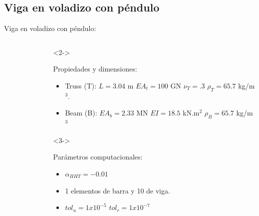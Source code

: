 \documentclass[
  aspectratio=169,
]{beamer}
\begin{document}
\begin{small}
\subsection[Viga en voladizo con péndulo]{Viga en voladizo con péndulo}
\begin{frame}[t]{Viga en voladizo con péndulo:}
	\begin{columns}[T,onlytextwidth]
		\begin{column}{.58\textwidth}
			\begin{minipage}{\textwidth}
				\begin{figure}[htbp]
					\centering
					\def\svgwidth{70mm}
					
				\end{figure}
			\end{minipage}  
		\end{column}
		\begin{column}{.4\textwidth}
			\begin{onlyenv}<2->
				\begin{minipage}{\textwidth}
					\vspace{-1cm}
					\begin{block}{Propiedades y dimensiones:}
						\begin{itemize}
							\item {\color{blue} Truss (T)}: $L= 3.04$ m $EA_t= 100$ GN $\nu_T=.3$ $\rho_T=65.7$ kg/m $^3$.
							\item {\color{red} Beam (B)}:  $EA_b= 2.33$ MN $EI= 18.5$ kN.m$^2$   $\rho_B=65.7$ kg/m$^3$
						\end{itemize}	 
					\end{block}
				\end{minipage}
			\end{onlyenv}
			\begin{onlyenv}<3->
				\begin{minipage}{\textwidth}
					\begin{block}{Parámetros computacionales:}
						\begin{itemize}
							\item $\alpha_{HHT} = -0.01$
							\item 1 elementos de barra y 10  de viga. 
							\item $tol_u =1$$x10^{-5} $ $tol_r =1x10^{-7} $ 
						\end{itemize}	 
					\end{block}
				\end{minipage}
			\end{onlyenv}
		\end{column}
	\end{columns}
\end{frame}



\end{small}
\end{document}

